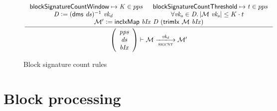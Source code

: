 \documentclass[11pt,a4paper]{article}
\newcommand{\var}[1]{\mathit{#1}}
\newcommand{\fun}[1]{\mathsf{#1}}
\newcommand{\type}[1]{\mathsf{#1}}
\newcommand{\pp}[1]{\mathsf{#1}}
\newcommand{\size}[1]{\left| #1 \right|}
\newcommand{\trans}[2]{\xlongrightarrow[\textsc{#1}]{#2}}
\newcommand{\leteq}{\ensuremath{\mathrel{\mathop:}=}}
\newcommand{\partialf}{\mapsto}
\newcommand{\signmapname}{\mathcal{M}}
\newcommand{\trimixname}{trimIx}
\newcommand{\incixmapname}{incIxMap}
\newcommand{\signmap}[1]{\fun{\signmapname} ~ #1}
\newcommand{\trimix}[2]{\fun{\trimixname} ~ #1 ~ #2}
\newcommand{\incixmap}[3]{\fun{\incixmapname} ~ #1 ~ #2 ~ #3}
\begin{document}
\begin{figure}[ht]
  \begin{equation*}
    \inference
    {
      \pp{blockSignatureCountWindow} \partialf \var{K} \in pps & \pp{blockSignatureCountThreshold} \partialf \var{t} \in pps \\
      \var{D} \leteq (\fun{dms} ~ \var{ds})^{-1} ~ \var{vk_d} & \forall \var{vk_s} \in \var{D} . \size{\signmap{\var{vk_s}}} \leq K \cdot t \\
      \signmapname' \leteq \incixmap{\var{bIx}}{\var{D}}{(\trimix{\signmapname}{\var{bIx}})}
    }
    {
      \left(
        {\begin{array}{c}
           \var{pps} \\
           \var{ds} \\
           \var{bIx}
         \end{array}}
     \right)
     \vdash
     {\signmapname}
     \trans{sigcnt}{\var{vk_d}}
     {\signmapname'}
   }
   \label{eq:rule:sigcnt}
 \end{equation*}
 \caption{Block signature count rules}
 \label{fig:rules:sigcnt}
\end{figure}

\clearpage

\section{Block processing}
\label{sec:block-processing}

\newcommand{\BHEnv}{\type{BHEnv}}
\newcommand{\BHState}{\type{BHState}}

\newcommand{\BBEnv}{\type{BBEnv}}
\newcommand{\BBState}{\type{BBState}}

\newcommand{\Bhead}{\type{BlockHeader}}
\newcommand{\Bbody}{\type{BlockBody}}
\newcommand{\Bhtosign}{\type{BHToSign}}

\newcommand{\bheadname}{bHead}
\newcommand{\bhead}[1]{\fun{\bheadname}\ #1}
\newcommand{\bhhashname}{bhHash}
\newcommand{\bhhash}[1]{\fun{\bhhashname}\ #1}
\newcommand{\bhprevhashname}{bhPrevHash}
\newcommand{\bhprevhash}[1]{\fun{\bhprevhashname}\ #1}
\newcommand{\bhtosignname}{bhToSign}
\newcommand{\bhtosign}[1]{\fun{\bhtosignname}\ #1}
\newcommand{\bhslotname}{bhSlot}
\newcommand{\bhslot}[1]{\fun{\bhslotname}\ #1}
\newcommand{\bupdpayloadname}{bUpdPayload}
\newcommand{\bupdpayload}[1]{\fun{\bupdpayloadname}\ #1}

\newcommand{\bslotname}{bSlot}
\newcommand{\bslot}[1]{\fun{\bslotname}\ #1}
\end{document}
